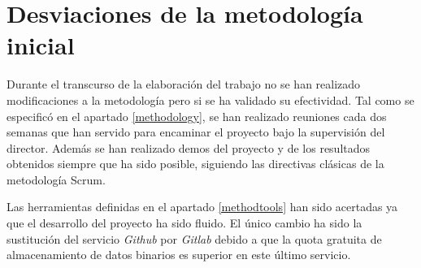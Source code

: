 \section{Desviaciones de la metodología inicial}\label{desvmethod}
Durante el transcurso de la elaboración del trabajo no se han realizado modificaciones a la metodología pero si se ha validado su efectividad.
Tal como se especificó en el apartado \ref{methodology}, se han realizado reuniones cada dos semanas que han servido para encaminar el proyecto bajo la supervisión del director. Además se han realizado demos del proyecto y de los resultados obtenidos siempre que ha sido posible, siguiendo las directivas clásicas de la metodología Scrum.

Las herramientas definidas en el apartado \ref{methodtools} han sido acertadas ya que el desarrollo del proyecto ha sido fluido. El único cambio ha sido la sustitución del servicio \textit{Github} por \textit{Gitlab} debido a que la quota gratuita de almacenamiento de datos binarios es superior en este último servicio.

